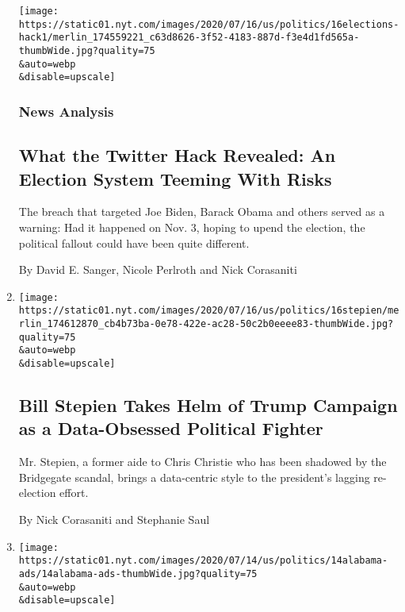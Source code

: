 \begin{enumerate}
  \texttt{[image: https://static01.nyt.com/images/2020/07/16/us/politics/16elections-hack1/merlin\_174559221\_c63d8626-3f52-4183-887d-f3e4d1fd565a-thumbWide.jpg?quality=75\\\&auto=webp\\\&disable=upscale]}

  \hypertarget{news-analysis}{%
  \subsubsection{News Analysis}\label{news-analysis}}

  \hypertarget{what-the-twitter-hack-revealed-an-election-system-teeming-with-risks}{%
  \subsection{What the Twitter Hack Revealed: An Election System Teeming
  With
  Risks}\label{what-the-twitter-hack-revealed-an-election-system-teeming-with-risks}}

  The breach that targeted Joe Biden, Barack Obama and others served as
  a warning: Had it happened on Nov. 3, hoping to upend the election,
  the political fallout could have been quite different.

  By David E. Sanger, Nicole Perlroth and Nick Corasaniti
\item
  \href{/article/bill-stepien.html}{}

  \texttt{[image: https://static01.nyt.com/images/2020/07/16/us/politics/16stepien/merlin\_174612870\_cb4b73ba-0e78-422e-ac28-50c2b0eeee83-thumbWide.jpg?quality=75\\\&auto=webp\\\&disable=upscale]}

  \hypertarget{bill-stepien-takes-helm-of-trump-campaign-as-a-data-obsessed-political-fighter}{%
  \subsection{Bill Stepien Takes Helm of Trump Campaign as a
  Data-Obsessed Political
  Fighter}\label{bill-stepien-takes-helm-of-trump-campaign-as-a-data-obsessed-political-fighter}}

  Mr. Stepien, a former aide to Chris Christie who has been shadowed by
  the Bridgegate scandal, brings a data-centric style to the president's
  lagging re-election effort.

  By Nick Corasaniti and Stephanie Saul
\item
  \href{/2020/07/14/us/alabamas-senate-primary.html}{}

  \texttt{[image: https://static01.nyt.com/images/2020/07/14/us/politics/14alabama-ads/14alabama-ads-thumbWide.jpg?quality=75\\\&auto=webp\\\&disable=upscale]}


\end{enumerate}
